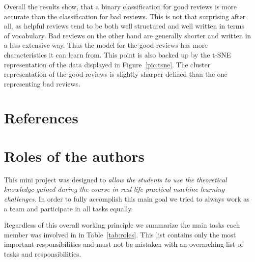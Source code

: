 \documentclass[a4paper,11pt]{article}
\begin{document}
Overall the results show, that a binary classification for good reviews is more accurate than the classification for bad reviews. This is not that surprising after all, as helpful reviews tend to be both well structured and well written in terms of vocabulary. Bad reviews on the other hand are generally shorter and written in a less extensive way. Thus the model for the good reviews has more characteristics it can learn from. This point is also backed up by the t-SNE representation of the data displayed in Figure~\ref{pic:tsne}. The cluster representation of the good reviews is slightly sharper defined than the one representing bad reviews.


\section{References}

{}



\section{Roles of the authors}

This mini project was designed to \textit{allow the students to use the theoretical knowledge gained during the course in real life practical machine learning challenges}. In order to fully accomplish this main goal we tried to always work as a team and participate in all tasks equally.

Regardless of this overall working principle we summarize the main tasks each member was involved in in Table~\ref{tab:roles}. This list contains only the most important responsibilities and must not be mistaken with an overarching list of tasks and responsibilities.
\end{document}
